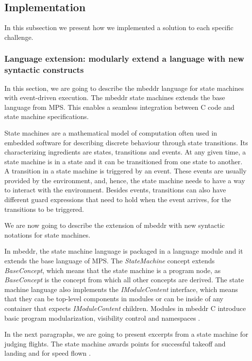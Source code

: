 \documentclass[preprint,numbers,10pt]{sigplanconf}
\begin{document}
\subsection{Implementation}

In this subsection we present how we implemented a solution to each specific challenge.

\subsubsection{Language extension: modularly extend a language with new syntactic constructs}
\label{evr:langext}

In this section, we are going to describe the mbeddr language for state
machines with event-driven execution. The mbeddr state machines extends
the base language from MPS. This enables a seamless integration between
C code and state machine specifications.

State machines are a mathematical model of computation often used in embedded software
for describing discrete behaviour through state transitions. Its characterizing
ingredients are states, transitions and events. At any given time, a state
machine is in a state and it can be transitioned from one state to another.
A transition in a state machine is triggered by an event. These events
are usually provided by the environment, and, hence, the state machine
needs to have a way to interact with the environment. Besides events,
transitions can also have different guard expressions that need to hold when
the event arrives, for the transitions to be triggered.

We are now going to describe the extension of mbeddr with new syntactic notations for state machines.

In mbeddr, the state machine language is packaged in a language module and it
extends the base language of MPS. The \emph{StateMachine} concept extends
\emph{BaseConcept}, which means that the state machine is a program node,
as \emph{BaseConcept} is the concept from which all other concepts are derived.
The state machine language also implements the \emph{IModuleContent} interface,
which means that they can be top-level components in modules or can be inside of any
container that expects \emph{IModuleContent} children. Modules in mbeddr C
introduce basic program modularization, visibility control and namespaces \cite{voelter2013mbeddr}.

In the next paragraphs, we are going to present excerpts from a state machine for
judging flights. The state machine awards points for successful
takeoff and landing and for speed flown \cite{voelter2014generic}.
\end{document}
